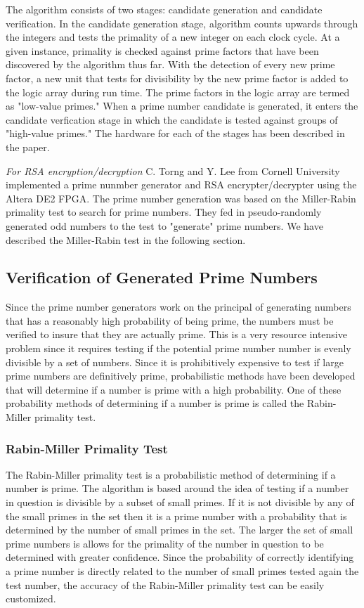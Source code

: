 \documentclass[journal]{IEEEtran}
\begin{document}
The algorithm consists of two stages: candidate generation and candidate verification. In the candidate generation stage, algorithm counts upwards through the integers and tests the primality of a new integer on each clock cycle. At a given instance, primality is checked against prime factors that have been discovered by the algorithm thus far. With the detection of every new prime factor, a new unit that tests for divisibility by the new prime factor is added to the logic array during run time. The prime factors in the logic array are termed as "low-value primes." When a prime number candidate is generated, it enters the candidate verfication stage in which the candidate is tested against groups of "high-value primes." The hardware for each of the stages has been described in the paper. 

\textit{For RSA encryption/decryption}
C. Torng and Y. Lee from Cornell University implemented a prime nunmber generator and RSA encrypter/decrypter using the Altera DE2 FPGA. The prime number generation was based on the Miller-Rabin primality test to search for prime numbers. They fed in pseudo-randomly generated odd numbers to the test to "generate" prime numbers. We have described the Miller-Rabin test in the following section.  


\subsection{Verification of Generated Prime Numbers}
Since the prime number generators work on the principal of generating numbers that has a reasonably high probability of being prime, the numbers must be verified to insure that they are actually prime. This is a very resource intensive problem since it requires testing if the potential prime number number is evenly divisible by a set of numbers. Since it is prohibitively expensive to test if large prime numbers are definitively prime, probabilistic methods have been developed that will determine if a number is prime with a high probability. One of these probability methods of determining if a number is prime is called the Rabin-Miller primality test. \\

\subsubsection{Rabin-Miller Primality Test}
The Rabin-Miller primality test is a probabilistic method of determining if a number is prime. The algorithm is based around the idea of testing if a number in question is divisible by a subset of small primes. If it is not divisible by any of the small primes in the set then it is a prime number with a probability that is determined by the number of small primes in the set. The larger the set of small prime numbers is allows for the primality of the number in question to be determined with greater confidence. Since the probability of correctly identifying a prime number is directly related to the number of small primes tested again the test number, the accuracy of the Rabin-Miller primality test can be easily customized. \cite{cheung} \\
\end{document}
